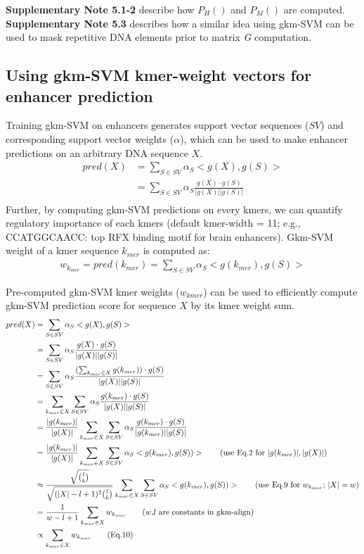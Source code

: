 \documentclass[english]{article}
\begin{document}
\textbf{Supplementary Note 5.1-2} describe how $P_H()$ and $P_M()$ are computed. \textbf{Supplementary Note 5.3} describes how a similar idea using gkm-SVM can be used to mask repetitive DNA elements prior to matrix \textit{G} computation.

 \subsection{Using gkm-SVM kmer-weight vectors for enhancer prediction}
 Training gkm-SVM on enhancers generates support vector sequences ($SV$) and corresponding support vector weights ($\alpha$), which can be used to make enhancer predictions on an arbitrary DNA sequence $X$. 
 \begin{align*}
     pred(X)&=\sum_{S \in SV} \alpha_S <g(X),g(S)> \\  &=\sum_{S \in SV} \alpha_S \frac{g(X)\cdot g(S)}{|g(X)||g(S)|} \\
 \end{align*}
 Further, by computing gkm-SVM predictions on every kmers, we can quantify regulatory importance of each kmers (default kmer-width = 11; e.g., CCATGGCAACC: top RFX binding motif for brain enhancers). Gkm-SVM weight of a kmer sequence $k_{mer}$ is computed as:
 \begin{align*}
     w_{k_{mer}} = pred(k_{mer}) = \sum_{S \in SV} \alpha_S <g(k_{mer}),g(S)> \tag{Eq.9}
 \end{align*}

Pre-computed gkm-SVM kmer weights ($w_{kmer}$) can be used to efficiently compute gkm-SVM prediction score for sequence $X$ by its kmer weight sum.
 \begin{align*}
     pred(X)&=\sum_{S \in SV} \alpha_S <g(X),g(S)> \\
     &=\sum_{S \in SV} \alpha_S \frac{g(X)\cdot g(S)}{|g(X)||g(S)|} \\
     &=\sum_{S \in SV} \alpha_S \frac{(\sum_{k_{mer} \in X}g(k_{mer}))\cdot g(S)}{|g(X)||g(S)|} \\
     &=\sum_{k_{mer} \in X} \sum_{S \in SV} \alpha_{S}\frac{g(k_{mer})\cdot g(S)}{|g(X)||g(S)|} \\
     &=\frac{|g(k_{mer})|}{|g(X)|}\sum_{k_{mer} \in X} \sum_{S \in SV} \alpha_{S}\frac{g(k_{mer})\cdot g(S)}{|g(k_{mer})||g(S)|} \\
     &=\frac{|g(k_{mer})|}{|g(X)|} \sum_{k_{mer} \in X} \sum_{S \in SV} \alpha_{S}<g(k_{mer}),g(S))> \tag{use Eq.2 for $|g(k_{mer})|, |g(X)|$} \\
     &\approx\frac{\sqrt{\binom{l}{k}}}{\sqrt{(|X|-l+1)^2\binom{l}{k}}} \sum_{k_{mer} \in X} \sum_{S \in SV} \alpha_{S}<g(k_{mer}),g(S))>  \tag{use Eq.9 for $w_{k_{mer}}$; $|X|=w$}\\
     &=\frac{1}{w-l+1} \sum_{k_{mer}\in X}w_{k_{mer}} \tag{$w$,$l$ are constants in gkm-align}\\
     &\propto \sum_{k_{mer}\in X}w_{k_{mer}} \tag{Eq.10}
 \end{align*}
\end{document}
